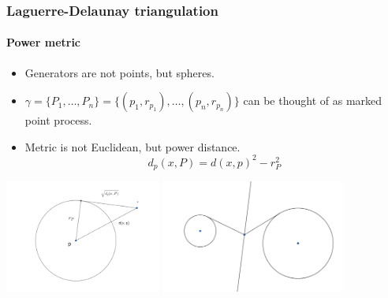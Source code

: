 \documentclass[c, 10pt]{beamer}
\begin{document}
\begin{frame}\frametitle{Laguerre-Delaunay triangulation}\framesubtitle{Power metric}
\begin{itemize}
\item Generators are not points, but \alert{spheres}. 
\item $\gamma = \{P_1,\dots, P_n\} = \{(p_1, r_{p_1}), \dots , (p_n, r_{p_n})\}$ can be thought of as \alert{marked point process}.
\item Metric is not Euclidean, but \alert{power distance}.
$$ d_p(x,P) = d(x,p)^2 - r_P^2$$
\end{itemize}

\begin{center}
\includegraphics[height = 3.7cm]{./FigureLayout/powerdistance.png}
\includegraphics[height = 3.7cm]{./FigureLayout/perpendicularbisector.png}
\end{center}

\end{frame}
\end{document}
